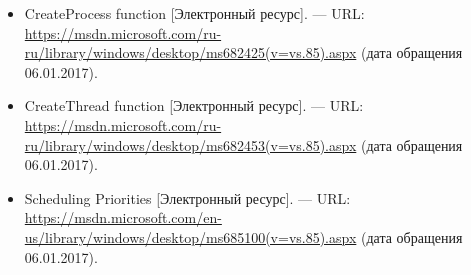 \documentclass[14pt,a4paper,report]{report}
\begin{document}
\begin{itemize}
	\item CreateProcess function [Электронный ресурс]. — URL: \href{https://msdn.microsoft.com/ru-ru/library/windows/desktop/ms682425(v=vs.85).aspx}{https://msdn.microsoft.com/ru-ru/library/windows/\linebreak desktop/ms682425(v=vs.85).aspx} (дата обращения 06.01.2017).
	
	\item CreateThread function [Электронный ресурс]. — URL: \href{https://msdn.microsoft.com/ru-ru/library/windows/desktop/ms682453(v=vs.85).aspx}{https://msdn.microsoft.com/ru-ru/library/windows/\linebreak desktop/ms682453(v=vs.85).aspx} (дата обращения 06.01.2017).
	
	\item Scheduling Priorities [Электронный ресурс]. — URL: \href{https://msdn.microsoft.com/en-us/library/windows/desktop/ms685100(v=vs.85).aspx}{https://msdn.microsoft.com/en-us/library/windows/\linebreak desktop/ms685100(v=vs.85).aspx} (дата обращения 06.01.2017).
	
\end{itemize}
\end{document}
